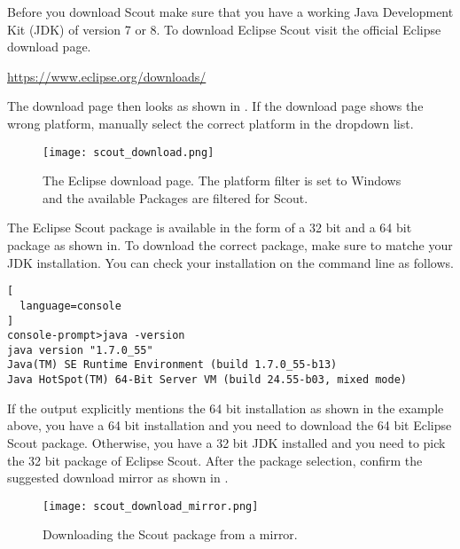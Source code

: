 %

Before you download Scout make sure that you have a working Java Development Kit (JDK) of version 7 or 8.
To download Eclipse Scout visit the official Eclipse download page.

\ifpdf
\url{https://www.eclipse.org/downloads/}
\else
{}
\fi

The download page then looks as shown in .
If the download page shows the wrong platform, manually select the correct platform in the dropdown list.

\begin{figure}
\texttt{[image: scout\_download.png]}
\caption{The Eclipse download page. The platform filter is set to Windows and the available Packages are filtered for Scout.}
\end{figure}

The Eclipse Scout package is available in the form of a 32 bit and a 64 bit package as shown in. 
To download the correct package, make sure to matche your JDK installation. 
You can check your installation on the command line as follows.

\begin{lstlisting}[
  language=console
]
console-prompt>java -version
java version "1.7.0_55"
Java(TM) SE Runtime Environment (build 1.7.0_55-b13)
Java HotSpot(TM) 64-Bit Server VM (build 24.55-b03, mixed mode)
\end{lstlisting}

If the output explicitly mentions the 64 bit installation as shown in the example above, you have a 64 bit installation and you need to download the 64 bit Eclipse Scout package. 
Otherwise, you have a 32 bit JDK installed and you need to pick the 32 bit package of Eclipse Scout.
After the package selection, confirm the suggested download mirror as shown in .

\begin{figure}
\texttt{[image: scout\_download\_mirror.png]}
\caption{Downloading the Scout package from a mirror.}
\end{figure}

